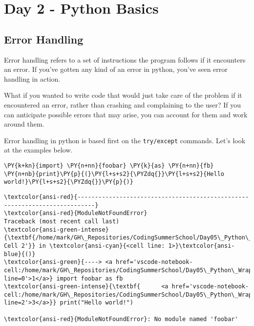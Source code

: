 \chapter{Day 2 - Python Basics}
\section{Error Handling}
Error handling refers to a set of instructions the program follows if it
encounters an error. If you've gotten any kind of an error in python,
you've seen error handling in action.

What if you wanted to write code that would just take care of the
problem if it encountered an error, rather than crashing and complaining
to the user? If you can anticipate possible errors that may arise, you
can account for them and work around them.

Error handling in python is based first on the \texttt{try/except}
commands. Let's look at the examples below.

    \begin{tcolorbox}[breakable, size=fbox, boxrule=1pt, pad at break*=1mm,colback=cellbackground, colframe=cellborder]
\begin{Verbatim}[commandchars=\\\{\}]
\PY{k+kn}{import} \PY{n+nn}{foobar} \PY{k}{as} \PY{n+nn}{fb}
\PY{n+nb}{print}\PY{p}{(}\PY{l+s+s2}{\PYZdq{}}\PY{l+s+s2}{Hello world!}\PY{l+s+s2}{\PYZdq{}}\PY{p}{)}
\end{Verbatim}
\end{tcolorbox}

    \begin{Verbatim}[commandchars=\\\{\}, frame=single, framerule=2mm, rulecolor=\color{outerrorbackground}]
\textcolor{ansi-red}{---------------------------------------------------------------------------}
\textcolor{ansi-red}{ModuleNotFoundError}                       Traceback (most recent call last)
\textcolor{ansi-green-intense}{\textbf{/home/mark/GH\_Repositories/CodingSummerSchool/Day05\_Python\_WrapUp/18\_Python\_Error\_Handling.ipynb Cell 2'}} in \textcolor{ansi-cyan}{<cell line: 1>}\textcolor{ansi-blue}{()}
\textcolor{ansi-green}{----> <a href='vscode-notebook-cell:/home/mark/GH\_Repositories/CodingSummerSchool/Day05\_Python\_WrapUp/18\_Python\_Error\_Handling.ipynb\#ch0000000?line=0'>1</a>} import foobar as fb
\textcolor{ansi-green-intense}{\textbf{      <a href='vscode-notebook-cell:/home/mark/GH\_Repositories/CodingSummerSchool/Day05\_Python\_WrapUp/18\_Python\_Error\_Handling.ipynb\#ch0000000?line=2'>3</a>}} print("Hello world!")

\textcolor{ansi-red}{ModuleNotFoundError}: No module named 'foobar'
    \end{Verbatim}


